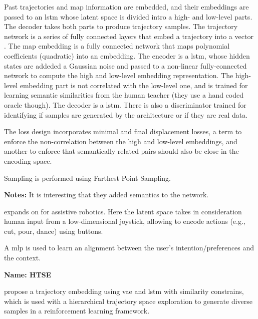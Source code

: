 Past trajectories and map information are embedded, and their embeddings are passed to an \gls{lstm} whose latent space is divided intro a high- and low-level parts. The decoder takes both parts to produce trajectory samples.
%
The trajectory network is a series of fully connected layers that embed a trajectory into a vector \cite{alahi2016social} .
%
The map embedding is a fully connected network that maps polynomial coefficients (quadratic) into an embedding.
%
The encoder is a \gls{lstm}, whose hidden states are addeded a Gaussian noise and passed to a non-linear fully-connected network to compute the high and low-level embedding representation. The high-level embedding part is not correlated with the low-level one, and is trained for learning semantic similarities from the human teacher (they use a hand coded oracle though).
%
The decoder is a \gls{lstm}.
%
There is also a discriminator trained for identifying if samples are generated by the architecture or if they are real data.

The loss design incorporates minimal and final displacement losses, a term to enforce the non-correlation between the high and low-level embeddings, and another to enforce that semantically related pairs should also be close in the encoding space.

Sampling is performed using Farthest Point Sampling.

\textbf{Notes:} It is interesting that they added semantics to the network.


\cite{losey2022learning} expands on \cite{losey2020controlling} for assistive robotics. Here the latent space takes in consideration human input from a low-dimensional joystick, allowing to encode actions (e.g., cut, pour, dance) using buttons.

A \gls{mlp} is used to learn an alignment between the user's intention/preferences and the context.


\textbf{Name: HTSE}

\cite{miao2022promoting} propose a trajectory embedding using \gls{vae} and \gls{lstm} with similarity constrains, which is used with a hierarchical trajectory space exploration to generate diverse samples in a reinforcement learning framework.


